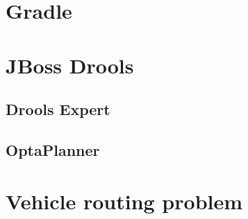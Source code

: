
\section{Gradle}


\section{JBoss Drools}

  \subsection{Drools Expert}

  \subsection{OptaPlanner}


\section{Vehicle routing problem}

